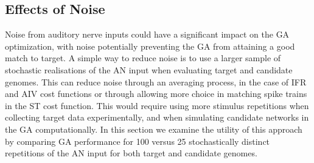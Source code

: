 % 
% 
% 




\subsection{Effects of Noise}\label{sec:GA:effects-noise}

Noise from auditory nerve inputs could have a significant impact on
the GA optimization, with noise potentially preventing the GA from
attaining a good match to target. A simple way to reduce noise is to
use a larger sample of stochastic realisations of the AN input when
evaluating target and candidate genomes. This can reduce noise through
an averaging process, in the case of IFR and AIV cost functions or
through allowing more choice in matching spike trains in the ST cost
function. This would require using more stimulus repetitions when
collecting target data experimentally, and when simulating candidate
networks in the GA computationally. In this section we examine the
utility of this approach by comparing GA performance for 100 versus 25
stochastically distinct repetitions of the AN input for both target
and candidate genomes.

\smallskip{}


